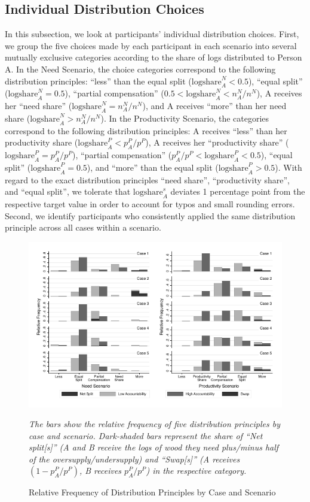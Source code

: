\documentclass[smallcondensed]{svjour3}
\begin{document}
\subsection{Individual Distribution Choices}\label{sec:choices}
%
In this subsection, we look at participants' individual distribution choices. First, we group the five choices made by each participant in each scenario into several mutually exclusive categories according to the share of logs distributed to Person A. In the Need Scenario, the choice categories correspond to the following distribution principles: ``less'' than the equal split ($\mbox{logshare}_A^N<0.5$), ``equal split'' ($\mbox{logshare}_A^N=0.5$), ``partial compensation'' ($0.5<\mbox{logshare}_A^N<n_A^N/n^N$), A receives her ``need share'' ($\mbox{logshare}_A^N=n_A^N/n^N$), and A receives ``more'' than her need share ($\mbox{logshare}_A^N>n_A^N/n^N$). In the Productivity Scenario, the categories correspond to the following distribution principles: A receives ``less'' than her productivity share ($\mbox{logshare}_A^P<p_A^P/p^P$), A receives her ``productivity share'' ($\mbox{logshare}_A^P=p_A^P/p^P$), ``partial compensation'' ($p_A^P/p^P<\mbox{logshare}_A^P<0.5$), ``equal split'' ($\mbox{logshare}_A^P=0.5$), and ``more'' than the equal split ($\mbox{logshare}_A^P>0.5$). With regard to the exact distribution principles ``need share'', ``productivity share'', and ``equal split'', we tolerate that $\mbox{logshare}_A^s$ deviates 1 percentage point from the respective target value in order to account for typos and small rounding errors. Second, we identify participants who consistently applied the same distribution principle across all cases within a scenario.\par
%
\begin{figure}[ht!]
   \centering
   \includegraphics[scale=1]{figures/main_types_1.pdf}
   \begin{minipage}{10cm}
   \footnotesize
   \emph{The bars show the relative frequency of five distribution principles by case and scenario. Dark-shaded bars represent the share of ``Net split[s]'' (A and B receive the logs of wood they need plus/minus half of the oversupply/undersupply) and ``Swap[s]'' (A receives $(1-p_A^P/p^P)$, B receives $p_A^P/p^P$) in the respective category.}
   \caption{Relative Frequency of Distribution Principles by Case and Scenario}
   \label{fig:histogram}
\end{minipage}
\end{figure}
\end{document}
